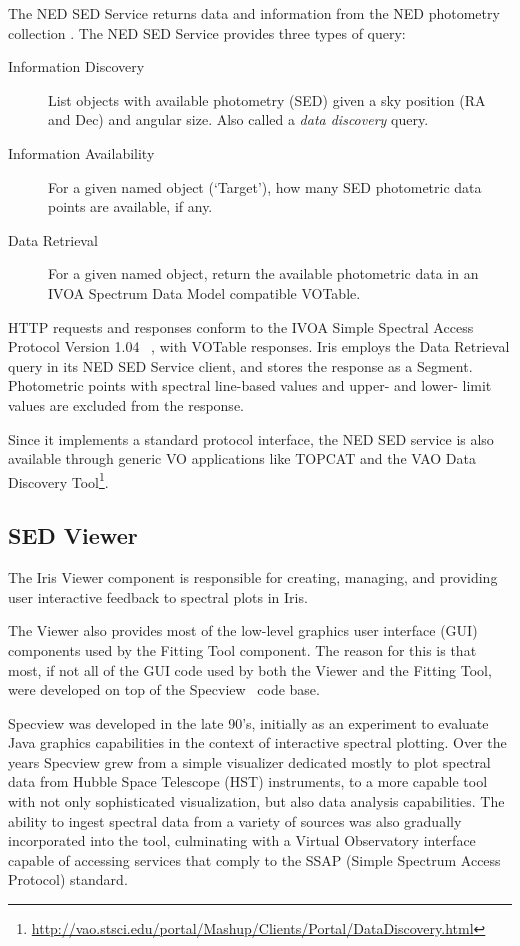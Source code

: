 \documentclass[final,5p,authoryear]{elsarticle}
\begin{document}
The NED SED Service returns data and information from the NED photometry
collection \citep{2007ASPC..376..153M}. The NED SED Service provides three types
of query: \begin{description} \item[Information Discovery] List objects with
available photometry (SED) given a sky position (RA and Dec) and angular size.
Also called a \emph{data discovery} query.  \item[Information Availability] For
a given named object (`Target'), how many SED photometric data points are
available, if any.  \item[Data Retrieval] For a given named object, return the
available photometric data in an IVOA Spectrum Data Model compatible VOTable.
\end{description}

HTTP requests and responses conform to the IVOA Simple Spectral Access Protocol
Version 1.04 ~\citep[SSAP;][]{2012arXiv1203.5725T}, with VOTable responses. Iris
employs the Data Retrieval query in its NED SED Service client, and stores the
response as a Segment. Photometric points with spectral line-based values and
upper- and lower- limit values are excluded from the response.

Since it implements a standard protocol interface, the NED SED service is also
available through generic VO applications like TOPCAT and the VAO Data Discovery
Tool\footnote{\url{http://vao.stsci.edu/portal/Mashup/Clients/Portal/DataDiscovery.html}}.

\subsection{SED Viewer} \label{subsec:specview}
The Iris Viewer component is responsible for creating, managing, and providing
user interactive feedback to spectral plots in Iris.

The Viewer also provides most of the low-level graphics user interface (GUI)
components used by the Fitting Tool component. The reason for this is that most,
if not all of the GUI code used by both the Viewer and the Fitting Tool, were
developed on top of the Specview~\citep{2002ASPC..281..120B} code base.

Specview was developed in the late 90's, initially as an experiment to evaluate
Java graphics capabilities in the context of interactive spectral plotting. Over
the years Specview grew from a simple visualizer dedicated mostly to plot
spectral data from Hubble Space Telescope (HST) instruments, to a more capable
tool with not only sophisticated visualization, but also data analysis
capabilities. The ability to ingest spectral data from a variety of sources was
also gradually incorporated into the tool, culminating with a Virtual
Observatory interface capable of accessing services that comply to the SSAP
(Simple Spectrum Access Protocol) standard.
\end{document}
